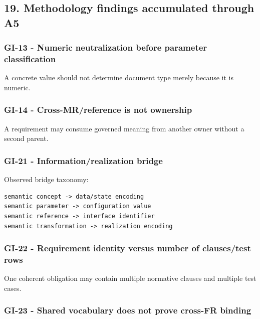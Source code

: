 \documentclass[11pt,a4paper]{article}
\begin{document}
\subsection{19. Methodology findings accumulated through
A5}\label{19-methodology-findings-accumulated-through-a5}

\subsubsection{GI-13 - Numeric neutralization before parameter
classification}\label{gi-13---numeric-neutralization-before-parameter-classification}

A concrete value should not determine document type merely because it is
numeric.

\subsubsection{GI-14 - Cross-MR/reference is not
ownership}\label{gi-14---cross-mrreference-is-not-ownership}

A requirement may consume governed meaning from another owner without a
second parent.

\subsubsection{GI-21 - Information/realization
bridge}\label{gi-21---informationrealization-bridge}

Observed bridge taxonomy:

\begin{verbatim}
semantic concept -> data/state encoding
semantic parameter -> configuration value
semantic reference -> interface identifier
semantic transformation -> realization encoding
\end{verbatim}

\subsubsection{GI-22 - Requirement identity versus number of
clauses/test
rows}\label{gi-22---requirement-identity-versus-number-of-clausestest-rows}

One coherent obligation may contain multiple normative clauses and
multiple test cases.

\subsubsection{GI-23 - Shared vocabulary does not prove cross-FR
binding}\label{gi-23---shared-vocabulary-does-not-prove-cross-fr-binding}
\end{document}
